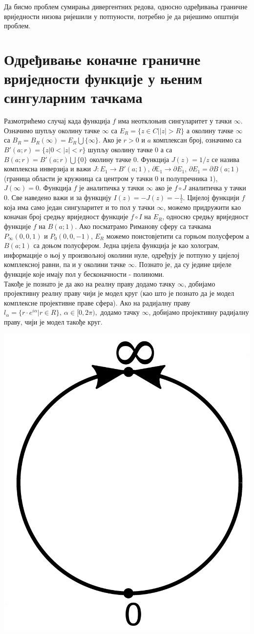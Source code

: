 \documentclass[12pt]{article}
\def\E{{\mathbb E}}
\begin{document}
Да бисмо проблем сумирања дивергентних редова, односно одређивања граничне вриједности низова ријешили у потпуности, потребно је да ријешимо општији проблем. 

\section{Одређивање коначне граничне вриједности функције у њеним сингуларним тачкама}

Размотрићемо случај када функција $f$ има неотклоњив сингуларитет у тачки $\infty$. Означимо шупљу околину тачке $\infty$ са $E_R=\{z\in C||z|>R\}$ а околину тачке $\infty$ са $B_R=B_R(\infty)=E_R\bigcup\{\infty\}$. Ако је $r>0$ и $a$ комплексан број, означимо са $B'(a;r)=\{z|0<|z|<r\}$ шупљу околину тачке $0$ а са $B(a;r)=B'(a;r)\bigcup\{0\}$ околину тачке $0$. Функција $J(z)=1/z$ се назива комплексна инверзија и важи $J:E_1\rightarrow B'(a;1)$, $\partial\E_1 \rightarrow\partial E_1$, $\partial E_1=\partial B(a;1)$ (граница области је кружница са центром у тачки $0$ и полупречника $1$), $J(\infty)=0$. Функција $f$ је аналитичка у тачки $\infty$ ако је $f\circ J$ аналитичка у тачки $0$. Све наведено важи и за функцију $I(z)=-J(z)=-\frac{1}{z}$. Цијелој функцији $f$ која има само један сингуларитет и то пол у тачки $\infty$, можемо придружити као коначан број средњу вриједност функције $f\circ I$ на $E_R$, односно средњу вриједност функције $f$ на $B(a;1)$. Ако посматрамо Риманову сферу са тачкама $P_\infty (0,0,1)$ и $P_0 (0,0,-1)$, $E_R$ можемо поистовјетити са горњом полусфером а $B(a;1)$ са доњом полусфером. Једна цијела функција је као холограм, информације о њој у произвољној околини нуле, одређују је потпуно у цијелој комплексној равни, па и у околини тачке $\infty$. Познато је, да су једине цијеле функције које имају пол у бесконачности - полиноми. \\
Такође је познато је да ако на реалну праву додамо тачку $\infty$, добијамо пројективну реалну праву чији је модел круг (као што је познато да је модел комплексне пројективне праве сфера). Ако на радијалну праву $l_\alpha=\{r\cdot e^{i\alpha}|r\in R\},\ \alpha\in[0,2\pi),$ додамо тачку $\infty$, добијамо пројективну радијалну праву, чији је модел такође круг.\\


\begin{center}
\includegraphics[width=0.38\linewidth,keepaspectratio]{Real_projective_line.png}
\end{center}
\end{document}
